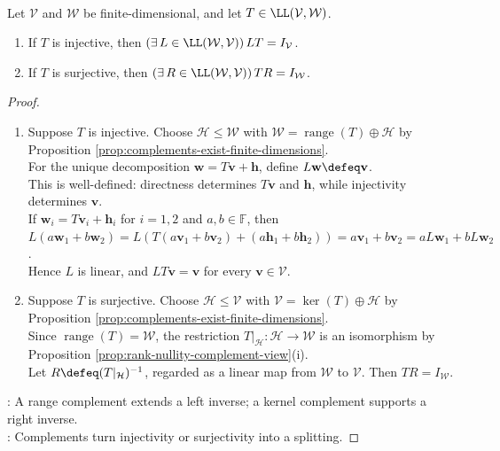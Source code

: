 \begin{proposition} \label{prop:finite-dimensional-one-sided-inverses-split} \\
Let $\mathcal{V}$ and $\mathcal{W}$ be finite-dimensional, and let $T\in\LL(\mathcal{V},\mathcal{W})$.
\begin{enumerate}[label=(\roman*)]
\setlength{\itemsep}{0pt}
\item If $T$ is injective, then $(\exists\,L\in\LL(\mathcal{W},\mathcal{V}))\,LT=I_{\mathcal{V}}$.
\item If $T$ is surjective, then $(\exists\,R\in\LL(\mathcal{W},\mathcal{V}))\,TR=I_{\mathcal{W}}$.
\end{enumerate}
\begin{proof}
\begin{enumerate}[label=(\roman*)]
\setlength{\itemsep}{0pt}
\item Suppose $T$ is injective. Choose $\mathcal{H}\leq\mathcal{W}$ with $\mathcal{W}=\operatorname{range}(T)\oplus\mathcal{H}$ by Proposition \ref{prop:complements-exist-finite-dimensions}.\\
For the unique decomposition $\mathbf{w}=T\mathbf{v}+\mathbf{h}$, define $L\mathbf{w}\defeq\mathbf{v}$.\\
This is well-defined: directness determines $T\mathbf{v}$ and $\mathbf{h}$, while injectivity determines $\mathbf{v}$.\\
If $\mathbf{w}_i=T\mathbf{v}_i+\mathbf{h}_i$ for $i=1,2$ and $a,b\in\mathbb{F}$, then $L(a\mathbf{w}_1+b\mathbf{w}_2)=L(T(a\mathbf{v}_1+b\mathbf{v}_2)+(a\mathbf{h}_1+b\mathbf{h}_2))=a\mathbf{v}_1+b\mathbf{v}_2=aL\mathbf{w}_1+bL\mathbf{w}_2$.\\
Hence $L$ is linear, and $LT\mathbf{v}=\mathbf{v}$ for every $\mathbf{v}\in\mathcal{V}$.
\item Suppose $T$ is surjective. Choose $\mathcal{H}\leq\mathcal{V}$ with $\mathcal{V}=\ker(T)\oplus\mathcal{H}$ by Proposition \ref{prop:complements-exist-finite-dimensions}.\\
Since $\operatorname{range}(T)=\mathcal{W}$, the restriction $T|_{\mathcal{H}}:\mathcal{H}\to\mathcal{W}$ is an isomorphism by Proposition \ref{prop:rank-nullity-complement-view}(i).\\
Let $R\defeq(T|_{\mathcal{H}})^{-1}$, regarded as a linear map from $\mathcal{W}$ to $\mathcal{V}$. Then $TR=I_{\mathcal{W}}$.
\end{enumerate}
: A range complement extends a left inverse; a kernel complement supports a right inverse.\\
: Complements turn injectivity or surjectivity into a splitting.
\end{proof}
\end{proposition}


